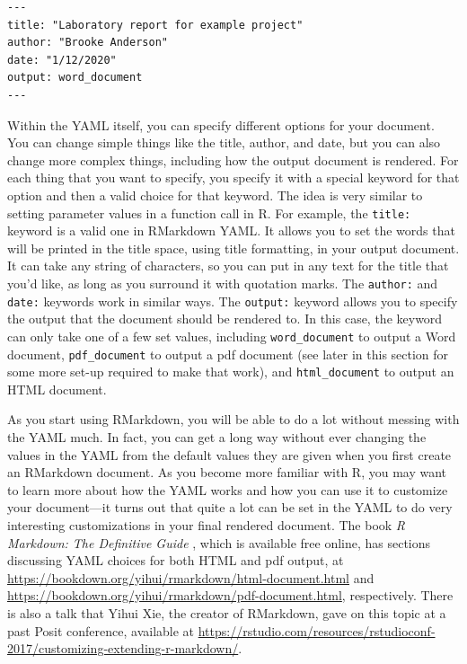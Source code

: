 \documentclass[]{tufte-book}
\begin{document}
\begin{verbatim}
---
title: "Laboratory report for example project"
author: "Brooke Anderson"
date: "1/12/2020"
output: word_document
---
\end{verbatim}

Within the YAML itself, you can specify different options for your document.
You can change simple things like the title, author, and date, but you can
also change more complex things, including how the output document is rendered.
For each thing that you want to specify, you specify it with a special
keyword for that option and then a valid choice for that keyword. The idea
is very similar to setting parameter values in a function call in R. For
example, the \texttt{title:} keyword is a valid one in RMarkdown YAML. It allows you
to set the words that will be printed in the title space, using title formatting,
in your output document. It can take any string of characters, so you can put in
any text for the title that you'd like, as long as you surround it with quotation
marks. The \texttt{author:} and \texttt{date:} keywords work in similar ways. The \texttt{output:}
keyword allows you to specify the output that the document should be rendered to.
In this case, the keyword can only take one of a few set values, including
\texttt{word\_document} to output a Word document, \texttt{pdf\_document} to output a pdf
document (see later in this section for some more set-up required to make that
work), and \texttt{html\_document} to output an HTML document.

As you start using RMarkdown, you will be able to do a lot without messing with
the YAML much. In fact, you can get a long way without ever changing the values
in the YAML from the default values they are given when you first create an
RMarkdown document. As you become more familiar with R, you may want to learn
more about how the YAML works and how you can use it to customize your
document---it turns out that quite a lot can be set in the YAML to do very
interesting customizations in your final rendered document. The book \emph{R
Markdown: The Definitive Guide} \citep{xie2018r}, which is available free online, has
sections discussing YAML choices for both HTML and pdf output, at
\url{https://bookdown.org/yihui/rmarkdown/html-document.html} and
\url{https://bookdown.org/yihui/rmarkdown/pdf-document.html}, respectively. There is
also a talk that Yihui Xie, the creator of RMarkdown, gave on this topic at a
past Posit conference, available at
\url{https://rstudio.com/resources/rstudioconf-2017/customizing-extending-r-markdown/}.
\end{document}
